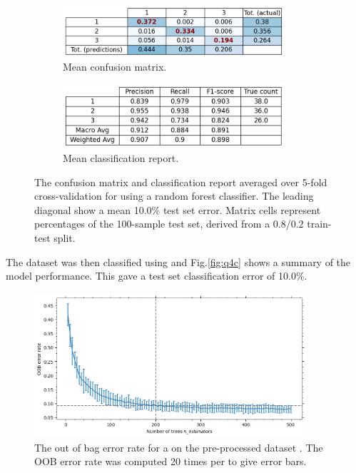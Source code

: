     \begin{figure}[htb]
    \centering
    \begin{subfigure}{0.5\textwidth}
        \centering
        \includegraphics[width=0.9\textwidth]{./figures/q4c_confusion_matrix}
        \caption{Mean confusion matrix.}
        \label{fig:q4c_confusion_matrix}
    \end{subfigure}%
    \begin{subfigure}{0.5\textwidth}
        \centering
        \includegraphics[width=0.9\textwidth]{./figures/q4c_classification_report}
        \caption{Mean classification report.}
        \label{fig:q4c_classification_report}
    \end{subfigure}
    \caption{The confusion matrix and classification report averaged over 5-fold cross-validation for
         using a random forest classifier.
        The leading diagonal show a mean 10.0\% test set error.
        Matrix cells represent percentages of the 100-sample test set, derived from a 0.8/0.2 train-test split.}
    \label{fig:q4c}
    \end{figure}

    The dataset was then classified using  and Fig.\eqref{fig:q4c} shows a summary
    of the model performance.
    This gave a test set classification error of 10.0\%.

    \begin{figure}[htb]
    \centering
    \includegraphics[width=0.9\textwidth]{./figures/q4d}
    \caption{The out of bag error rate for a  on the pre-processed dataset
        . The OOB error rate was computed 20 times per
         to give error bars.}
        \label{fig:q4d}
    \end{figure}

